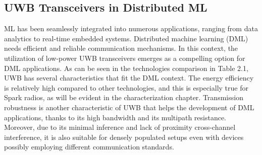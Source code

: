 \subsection{UWB Transceivers in Distributed ML}
\label{UWB_distrobuted_ML}
ML has been seamlessly integrated into numerous applications, ranging from data analytics to real-time embedded systems. Distributed machine learning (DML) needs efficient and reliable communication mechanisms. In this context, the utilization of low-power UWB transceivers emerges as a compelling option for DML applications. As can be seen in the technologies comparison in Table 2.1, UWB has several characteristics that fit the DML context. The energy efficiency is relatively high compared to other technologies, and this is especially true for Spark radios, as will be evident in the characterization chapter. Transmission robustness is another characteristic of UWB that helps the development of DML applications, thanks to its high bandwidth and its multipath resistance. Moreover, due to its minimal inference and lack of proximity cross-channel interference, it is also suitable for densely populated setups even with devices possibly employing different communication standards.



\newpage



